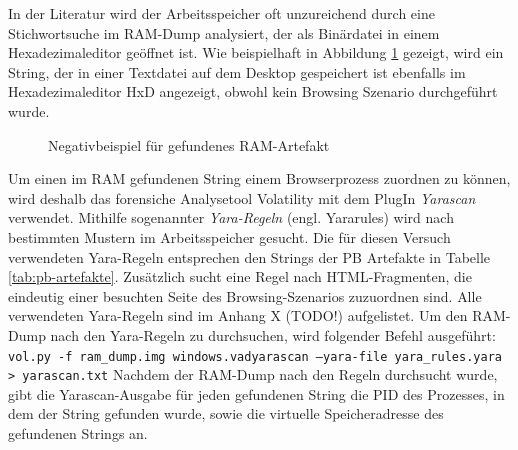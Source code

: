 In der Literatur wird der Arbeitsspeicher oft unzureichend durch eine Stichwortsuche im RAM-Dump analysiert, der als Binärdatei in einem Hexadezimaleditor geöffnet ist. \cite{Rochmadi.2017, Md.2018, Montasari.2015}
Wie beispielhaft in Abbildung \ref{img:textfile-ram-artifact} gezeigt, wird ein String, der in einer Textdatei auf dem Desktop gespeichert ist ebenfalls im Hexadezimaleditor HxD angezeigt, obwohl kein Browsing Szenario durchgeführt wurde.
\begin{figure}[h!]
	\centering
	\hfill
	\label{img:textfile-ram-artifact}  
	\caption{Negativbeispiel für gefundenes RAM-Artefakt}
\end{figure}

Um einen im RAM gefundenen String einem Browserprozess zuordnen zu können, wird deshalb das forensiche Analysetool Volatility mit dem PlugIn \textit{Yarascan} verwendet.
Mithilfe sogenannter \textit{Yara-Regeln} (engl. Yararules) wird nach bestimmten Mustern im Arbeitsspeicher gesucht.
Die für diesen Versuch verwendeten Yara-Regeln entsprechen den Strings der PB Artefakte in Tabelle \ref{tab:pb-artefakte}. Zusätzlich sucht eine Regel nach HTML-Fragmenten, die eindeutig einer besuchten Seite des Browsing-Szenarios zuzuordnen sind. \cite{Said.2011}
Alle verwendeten Yara-Regeln sind im Anhang X (TODO!) aufgelistet.
Um den RAM-Dump nach den Yara-Regeln zu durchsuchen, wird folgender Befehl ausgeführt: \texttt{vol.py -f ram\_dump.img windows.vadyarascan --yara-file yara\_rules.yara > yarascan.txt}
Nachdem der RAM-Dump nach den Regeln durchsucht wurde, gibt die Yarascan-Ausgabe für jeden gefundenen String die PID des Prozesses, in dem der String gefunden wurde, sowie die virtuelle Speicheradresse des gefundenen Strings an.

